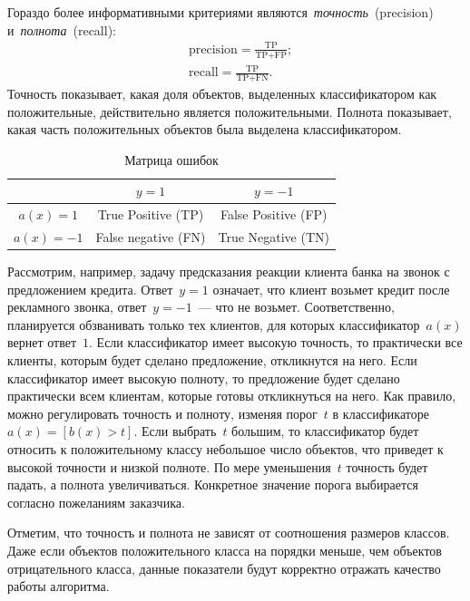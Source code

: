 \documentclass[12pt,fleqn]{article}
\begin{document}
Гораздо более информативными критериями являются~\emph{точность}~(precision)
и~\emph{полнота}~(recall):
\begin{align*}
    &\text{precision}
    =
    \frac{
        \text{TP}
    }{
        \text{TP} + \text{FP}
    };\\
    &\text{recall}
    =
    \frac{
        \text{TP}
    }{
        \text{TP} + \text{FN}
    }.
\end{align*}
Точность показывает, какая доля объектов, выделенных классификатором как положительные,
действительно является положительными.
Полнота показывает, какая часть положительных объектов была выделена классификатором.

\begin{table}[t]
    \centering
    \begin{tabular}{|c|c|c|}
        \hline
        & $y = 1$ & $y = -1$ \\ \hline
        $a(x) = 1$ & True Positive (TP) & False Positive (FP) \\ \hline
        $a(x) = -1$ & False negative (FN) & True Negative (TN) \\ \hline
    \end{tabular}
    \caption{Матрица ошибок}
    \label{tbl:confusion}
\end{table}

Рассмотрим, например, задачу предсказания реакции клиента банка на звонок с предложением кредита.
Ответ~$y = 1$ означает, что клиент возьмет кредит после рекламного звонка,
ответ~$y = -1$~--- что не возьмет.
Соответственно, планируется обзванивать только тех клиентов, для которых
классификатор~$a(x)$ вернет ответ~$1$.
Если классификатор имеет высокую точность, то практически все клиенты, которым
будет сделано предложение, откликнутся на него.
Если классификатор имеет высокую полноту, то предложение будет сделано практически
всем клиентам, которые готовы откликнуться на него.
Как правило, можно регулировать точность и полноту, изменяя порог~$t$
в классификаторе~$a(x) = [b(x) > t]$.
Если выбрать~$t$ большим, то классификатор будет относить к положительному классу
небольшое число объектов, что приведет к высокой точности и низкой полноте.
По мере уменьшения~$t$ точность будет падать, а полнота увеличиваться.
Конкретное значение порога выбирается согласно пожеланиям заказчика.

Отметим, что точность и полнота не зависят от соотношения размеров классов.
Даже если объектов положительного класса на порядки меньше,
чем объектов отрицательного класса, данные показатели будут корректно
отражать качество работы алгоритма.
\end{document}

